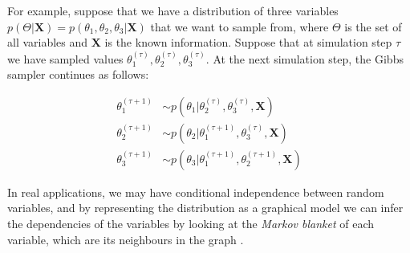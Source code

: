 For example, suppose that we have a distribution of three variables $p(\Theta|\mathbf{X}) = p(\theta_{1}, \theta_{2}, \theta_{3}|\mathbf{X})$ that we want to sample from, where $\Theta$ is the set of all variables and $\mathbf{X}$ is the known information. Suppose that at simulation step $\tau$ we have sampled values $\theta_{1}^{(\tau)}, \theta_{2}^{(\tau)}, \theta_{3}^{(\tau)}$. At the next simulation step, the Gibbs sampler continues as follows:

\begin{equation} \label{gibbs-f-bayes}
  \begin{aligned}
	\theta_{1}^{(\tau+1)} & \sim p(\theta_{1} | \theta_{2}^{(\tau)}, \theta_{3}^{(\tau)}, \mathbf{X}) \\
	\theta_{2}^{(\tau+1)} & \sim p(\theta_{2} | \theta_{1}^{(\tau+1)}, \theta_{3}^{(\tau)}, \mathbf{X}) \\
	\theta_{3}^{(\tau+1)} & \sim p(\theta_{3} | \theta_{1}^{(\tau+1)}, \theta_{2}^{(\tau+1)}, \mathbf{X}) 
  \end{aligned}
\end{equation}

In real applications, we may have conditional independence between random variables, and by representing the distribution as a graphical model we can infer the dependencies of the variables by looking at the \emph{Markov blanket} of each variable, which are its neighbours in the graph \cite[Ch. 24]{Murphy2012}. 

